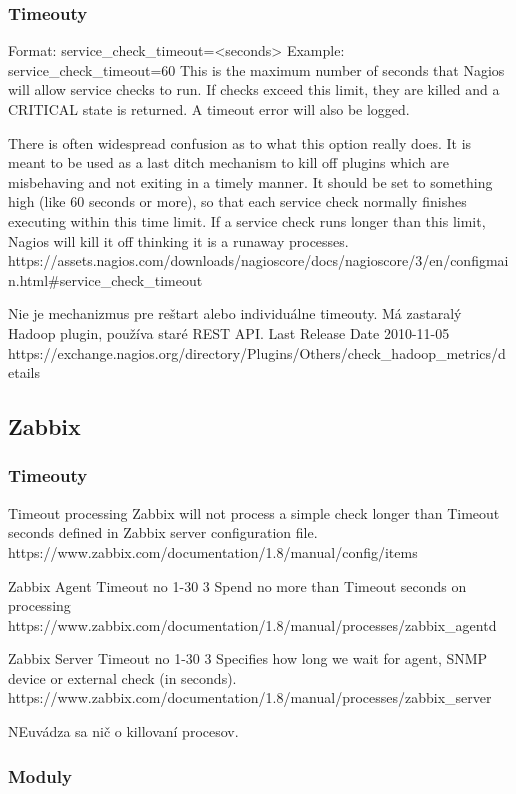 \documentclass[11pt,final,oneside]{fithesis}
\begin{document}
\subsubsection{Timeouty}

Format:	service_check_timeout=<seconds>
Example:	service_check_timeout=60
This is the maximum number of seconds that Nagios will allow service checks to run. If checks exceed this limit, they are killed and a CRITICAL state is returned. A timeout error will also be logged.

There is often widespread confusion as to what this option really does. It is meant to be used as a last ditch mechanism to kill off plugins which are misbehaving and not exiting in a timely manner. It should be set to something high (like 60 seconds or more), so that each service check normally finishes executing within this time limit. If a service check runs longer than this limit, Nagios will kill it off thinking it is a runaway processes.
https://assets.nagios.com/downloads/nagioscore/docs/nagioscore/3/en/configmain.html#service_check_timeout



Nie je mechanizmus pre reštart alebo individuálne timeouty.
Má zastaralý Hadoop plugin, používa staré REST API.
Last Release Date 2010-11-05
https://exchange.nagios.org/directory/Plugins/Others/check_hadoop_metrics/details

\subsection{Zabbix}
\subsubsection{Timeouty}
Timeout processing
Zabbix will not process a simple check longer than Timeout seconds defined in Zabbix server configuration file.
https://www.zabbix.com/documentation/1.8/manual/config/items

Zabbix Agent
Timeout	 no	 1-30	3	Spend no more than Timeout seconds on processing
https://www.zabbix.com/documentation/1.8/manual/processes/zabbix_agentd

Zabbix Server
Timeout	 no	 1-30	3	Specifies how long we wait for agent, SNMP device or external check (in seconds).
https://www.zabbix.com/documentation/1.8/manual/processes/zabbix_server

NEuvádza sa nič o killovaní procesov.
\subsubsection{Moduly}
\end{document}
